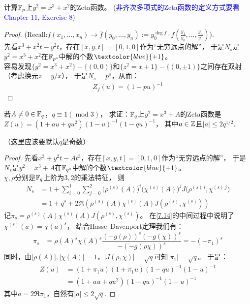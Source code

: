 \begin{exercise}\label{7.16}
    计算$\mathbb{F}_p$上$y^2=x^3+x^2$的Zeta函数。
    (\textcolor{blue}{非齐次多项式的Zeta函数的定义方式要看Chapter 11, Exercise 8})
\end{exercise}
\begin{proof}
    (Recall:$f(x_1,\ldots,x_n)\to\overline{f}(y_0,\ldots,y_n):=y_0^{\deg f}\cdot f(\frac{y_1}{y_0},\ldots,\frac{y_n}{y_0})$).\\
    先看$x^3+x^2t-y^2t$，存在$[x,y,t]=[0,1,0]$作为“无穷远点的解”，
    于是$N_s$是$y^2=x^3+x^2$在$\mathbb{F}_{p^s}$中解的个数$\textcolor{blue}{+1}$。\\
    容易发现$\{y^2=x^3+x^2\}-\{(0,0)\}$和$\{z^2=x+1\}-\{(0,\pm 1)\}$之间存在双射（考虑换元$z=y/x$），
    于是$N_s=p^s$，从而：
    \begin{align*}
        Z_f(u)=(1-pu)^{-1}
    \end{align*}
\end{proof}

\begin{exercise}\label{7.17}
    若$A\neq0\in\mathbb{F}_q$，$q\equiv1(\operatorname{mod}3)$，
    求证：$\mathbb{F}_q$上$y^2=x^3+A$的Zeta函数是$Z(u)=(1+au+qu^2)(1-u)^{-1}(1-qu)^{-1}$，
    其中$a\in\mathbb{Z}$且$|a|\leqslant2q^{1/2}$.
\end{exercise}
（这里应该要默认$q$是奇数）
\begin{proof}
    先看$x^3+y^2t-At^3$，存在$[x,y,t]=[0,1,0]$作为“无穷远点的解”，
    于是$N_s$是$y^2=x^3+A$在$\mathbb{F}_{q^s}$中解的个数$\textcolor{blue}{+1}$。\\
    $\chi,\rho$分别是$\mathbb{F}_q$上阶为$3,2$的乘法特征，
    则\begin{align*}
        N_s&=1+\sum_{i=0}^{1}\sum_{j=0}^2\bigl(\rho^{(s)}(A)\bigr)^i
        (\chi^{(s)}(A)\bigr)^j
        J\bigl( 
        \rho^{(s)\ i},\chi^{(s)\ j}
         \bigr)\\
         &=1+q^s+2\Re\left( 
         \rho^{(s)}(A)\chi^{(s)}(A)J(\rho^{(s)},\chi^{(s)})
          \right)
    \end{align*}
    记$\pi_s= \rho^{(s)}(A)\chi^{(s)}(A)J(\rho^{(s)},\chi^{(s)})$。
    在\ref{7.14}的中间过程中说明了$\chi^{(s)}(a)=\chi(a)^s$，
    结合Hasse--Davenport定理我们有：
    \begin{align*}
        \pi_s&=\rho(A)^s\chi(A)^s\dfrac{(-g(\rho))^s(-g(\chi))^s}{-(-g(\rho\chi))^s}=-(-\pi_1)^s
    \end{align*}
    同时，由$|\rho(A)|,|\chi(A)|=1$，$|J(\rho,\chi)|=\sqrt{q}$可知$|\pi_1|=\sqrt{q}$。
    于是：
    \begin{align*}
        Z(u)&=(1+\pi_1u)(1+\overline{\pi_1}u)(1-qu)^{-1}(1-u)^{-1}\\
        &=(1+au+qu^2)(1-qu)^{-1}(1-u)^{-1}
    \end{align*}
    其中$a=2\Re\pi_1$，自然有$|a|\leqslant2\sqrt{q}$.
\end{proof}


